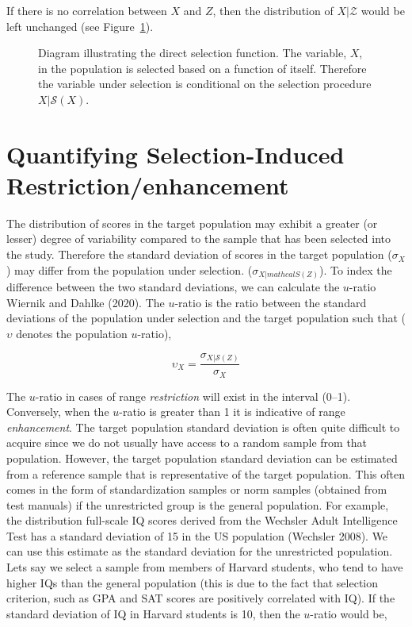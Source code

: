 \documentclass[
  letterpaper,
  DIV=11,
  numbers=noendperiod]{scrreprt}
\begin{document}
If there is no correlation between \(X\) and \(Z\), then the
distribution of \(X|\mathcal{Z}\) would be left unchanged (see
Figure~\ref{fig-indirect-select-diag-no-corr}).

\begin{figure}[H]


\caption{\label{fig-indirect-select-diag-no-corr}Diagram illustrating
the direct selection function. The variable, \(X\), in the population is
selected based on a function of itself. Therefore the variable under
selection is conditional on the selection procedure
\(X|\mathcal{S}(X)\).}

\end{figure}%

\section{Quantifying Selection-Induced
Restriction/enhancement}\label{quantifying-selection-induced-restrictionenhancement}

The distribution of scores in the target population may exhibit a
greater (or lesser) degree of variability compared to the sample that
has been selected into the study. Therefore the standard deviation of
scores in the target population (\(\sigma_{X}\)) may differ from the
population under selection. (\(\sigma_{X|mathcal{S}(Z)}\)). To index the
difference between the two standard deviations, we can calculate the
\(u\)-ratio Wiernik and Dahlke (2020). The \(u\)-ratio is the ratio
between the standard deviations of the population under selection and
the target population such that (\(\upsilon\) denotes the population
\(u\)-ratio),

\[
\upsilon_X = \frac{\sigma_{X|\mathcal{S}(Z)}}{\sigma_{X}}
\]

The \(u\)-ratio in cases of range \emph{restriction} will exist in the
interval (0--1). Conversely, when the \(u\)-ratio is greater than 1 it
is indicative of range \emph{enhancement}. The target population
standard deviation is often quite difficult to acquire since we do not
usually have access to a random sample from that population. However,
the target population standard deviation can be estimated from a
reference sample that is representative of the target population. This
often comes in the form of standardization samples or norm samples
(obtained from test manuals) if the unrestricted group is the general
population. For example, the distribution full-scale IQ scores derived
from the Wechsler Adult Intelligence Test has a standard deviation of 15
in the US population (Wechsler 2008). We can use this estimate as the
standard deviation for the unrestricted population. Lets say we select a
sample from members of Harvard students, who tend to have higher IQs
than the general population (this is due to the fact that selection
criterion, such as GPA and SAT scores are positively correlated with
IQ). If the standard deviation of IQ in Harvard students is 10, then the
\(u\)-ratio would be,
\end{document}
